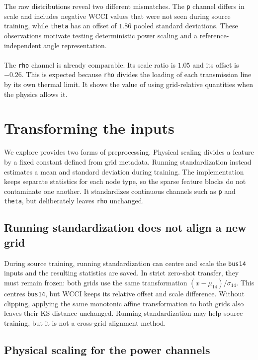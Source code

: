 \newpage

\noindent The raw distributions reveal two different
mismatches. The \texttt{p} channel differs in scale and includes negative WCCI
values that were not seen during source training, while \texttt{theta} has an
offset of $1.86$ pooled standard deviations. These observations motivate
testing deterministic power scaling and a reference-independent angle
representation.
\\
\\
The \texttt{rho} channel is already comparable. Its scale ratio
is $1.05$ and its offset is $-0.26$. This is expected because \texttt{rho}
divides the loading of each transmission line by its own thermal limit. It shows
the value of using grid-relative quantities when the physics allows it.


\section{Transforming the inputs}
\label{sec:wcci-correction}

We explore provides two forms of preprocessing. Physical scaling
divides a feature by a fixed constant defined from grid metadata. Running
standardization instead estimates a mean and standard deviation during
training. The implementation keeps separate statistics for each node type, so
the sparse feature blocks do not contaminate one another. It standardizes
continuous channels such as \texttt{p} and \texttt{theta}, but deliberately
leaves \texttt{rho} unchanged.

\subsection{Running standardization does not align a new grid}
\label{sec:wcci-running-norm}

During source training, running standardization can centre and
scale the \texttt{bus14} inputs and the resulting statistics are saved. In strict zero-shot transfer, they must remain frozen: both grids
use the same transformation $(x-\mu_{14})/\sigma_{14}$. This centres
\texttt{bus14}, but WCCI keeps its relative offset and scale difference.
Without clipping, applying the same monotonic affine transformation to both
grids also leaves their KS distance unchanged. Running standardization may help
source training, but it is not a cross-grid alignment method.

\subsection{Physical scaling for the power channels}
\label{sec:wcci-physical-scaling}

